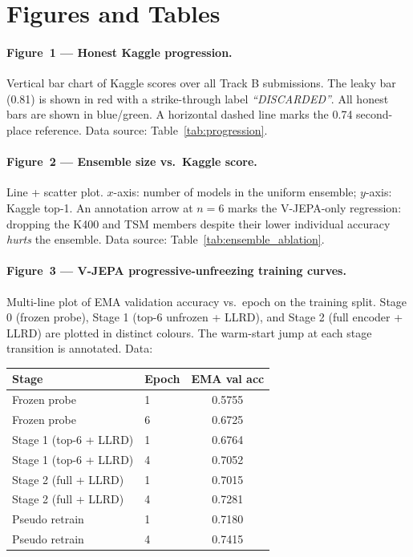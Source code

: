 \documentclass[10pt,twocolumn,letterpaper]{article}
\begin{document}
{\small


}

\clearpage
\appendix

\section*{Figures and Tables}

\paragraph{Figure~1 — Honest Kaggle progression.}
Vertical bar chart of Kaggle scores over all Track B submissions.
The leaky bar (0.81) is shown in red with a strike-through label
\emph{``DISCARDED''}. All honest bars are shown in blue/green.
A horizontal dashed line marks the 0.74 second-place reference.
Data source: Table~\ref{tab:progression}.

\paragraph{Figure~2 — Ensemble size vs.\ Kaggle score.}
Line + scatter plot. $x$-axis: number of models in the uniform ensemble;
$y$-axis: Kaggle top-1. An annotation arrow at $n{=}6$ marks the
V-JEPA-only regression: dropping the K400 and TSM members despite their
lower individual accuracy \emph{hurts} the ensemble.
Data source: Table~\ref{tab:ensemble_ablation}.

\paragraph{Figure~3 — V-JEPA progressive-unfreezing training curves.}
Multi-line plot of EMA validation accuracy vs.\ epoch on the training split.
Stage 0 (frozen probe), Stage 1 (top-6 unfrozen + LLRD), and Stage 2
(full encoder + LLRD) are plotted in distinct colours.
The warm-start jump at each stage transition is annotated.
Data:

\medskip
\begin{center}
\footnotesize
\setlength{\tabcolsep}{3pt}
\begin{tabular}{llc}
\toprule
Stage & Epoch & EMA val acc\\
\midrule
Frozen probe & 1 & 0.5755\\
Frozen probe & 6 & 0.6725\\
Stage 1 (top-6 + LLRD) & 1 & 0.6764\\
Stage 1 (top-6 + LLRD) & 4 & 0.7052\\
Stage 2 (full + LLRD) & 1 & 0.7015\\
Stage 2 (full + LLRD) & 4 & 0.7281\\
Pseudo retrain & 1 & 0.7180\\
Pseudo retrain & 4 & 0.7415\\
\bottomrule
\end{tabular}
\end{center}
\end{document}

